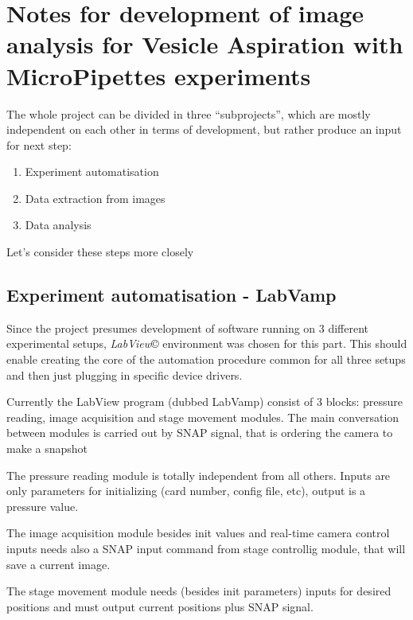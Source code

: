 
\chapter{Notes for development of image analysis for Vesicle Aspiration with MicroPipettes experiments}

The whole project can be divided in three ``subprojects'', which are mostly independent on each other in terms of development, but rather produce an input for next step:
\begin{enumerate}
	\item Experiment automatisation
	\item Data extraction from images
	\item Data analysis
\end{enumerate}
Let's consider these steps more closely

\section{Experiment automatisation - LabVamp}\label{experiment}

Since the project presumes development of software running on 3 different experimental setups, \emph{LabView}\copyright{} environment was chosen for this part. This should enable creating the core of the automation procedure common for all three setups and then just plugging in specific device drivers.

Currently the LabView program (dubbed LabVamp) consist of 3 blocks: pressure reading, image acquisition and stage movement modules. The main conversation between modules is carried out by SNAP signal, that is ordering the camera to make a snapshot

The pressure reading module is totally independent from all others. Inputs are only parameters for initializing (card number, config file, etc), output is a pressure value.

The image acquisition module besides init values and real-time camera control inputs needs also a SNAP input command from stage controllig module, that will save a current image.

The stage movement module needs (besides init parameters) inputs for desired positions and must output current positions plus SNAP signal.

